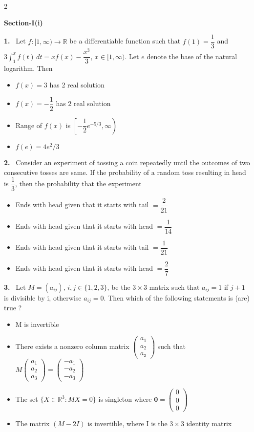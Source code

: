 \documentclass[10pt]{extarticle}
\newcommand{\partsec}[2]{\par\medskip\noindent{\large\bfseries PART-#1: #2}\par\smallskip}
\newcommand{\sect}[1]{\par\smallskip\noindent\textbf{#1}\par}
\newcommand{\qn}[1]{\par\smallskip\noindent\textbf{#1.}~}
\newenvironment{qoptions}{\begin{itemize}[leftmargin=1.8em,itemsep=1pt,topsep=2pt,label={}]}{\end{itemize}}
\newcommand{\opt}[2]{\item[(#1)] #2}
\begin{document}
\begin{multicols}{2}
\partsec{3}{MATHEMATICS}
\sect{Section-I(i)}

\qn{1} Let $f:[1,\infty)\to\mathbb R$ be a differentiable function such that $f(1)=\dfrac13$ and $3\displaystyle\int_1^xf(t)\,dt=xf(x)-\dfrac{x^3}3$, $x\in[1,\infty)$. Let $e$ denote the base of the natural logarithm. Then
\begin{qoptions}
\opt{A}{$f(x)=3$ has 2 real solution}
\opt{B}{$f(x)=-\dfrac12$ has 2 real solution}
\opt{C}{Range of $f(x)$ is $\left[-\dfrac12e^{-5/3},\infty\right)$}
\opt{D}{$f(e)=4e^2/3$}
\end{qoptions}

\qn{2} Consider an experiment of tossing a coin repeatedly until the outcomes of two consecutive tosses are same. If the probability of a random toss resulting in head is $\dfrac13$, then the probability that the experiment
\begin{qoptions}
\opt{A}{Ends with head given that it starts with tail $=\dfrac2{21}$}
\opt{B}{Ends with head given that it starts with head $=\dfrac1{14}$}
\opt{C}{Ends with head given that it starts with tail $=\dfrac1{21}$}
\opt{D}{Ends with head given that it starts with head $=\dfrac27$}
\end{qoptions}

\qn{3} Let $M=(a_{ij})$, $i,j\in\{1,2,3\}$, be the $3\times3$ matrix such that $a_{ij}=1$ if $j+1$ is divisible by i, otherwise $a_{ij}=0$. Then which of the following statements is (are) true ?
\begin{qoptions}
\opt{A}{M is invertible}
\opt{B}{There exists a nonzero column matrix $\begin{pmatrix}a_1\\a_2\\a_3\end{pmatrix}$ such that $M\begin{pmatrix}a_1\\a_2\\a_3\end{pmatrix}=\begin{pmatrix}-a_1\\-a_2\\-a_3\end{pmatrix}$}
\opt{C}{The set $\{X\in\mathbb R^3:MX=0\}$ is singleton where $\mathbf 0=\begin{pmatrix}0\\0\\0\end{pmatrix}$}
\opt{D}{The matrix $(M-2I)$ is invertible, where I is the $3\times3$ identity matrix}
\end{qoptions}


\end{multicols}
\end{document}

